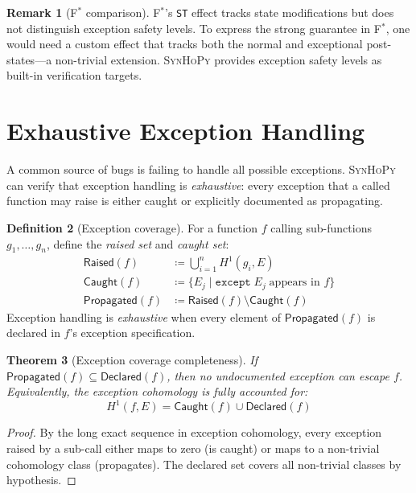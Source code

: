 \documentclass[11pt,a4paper]{report}
\theoremstyle{definition}
\newtheorem{definition}{Definition}[chapter]
\newtheorem{remark}[definition]{Remark}
\theoremstyle{plain}
\newtheorem{theorem}[definition]{Theorem}
\newcommand{\defeq}{\coloneqq}
\newcommand{\fstar}{F$^{*}$}
\newcommand{\synhopy}{\textsc{SynHoPy}}
\begin{document}
\begin{remark}[\fstar{} comparison]
\fstar{}'s \lstinline[style=fstar]|ST| effect tracks state modifications but
does not distinguish exception safety levels.  To express the strong guarantee
in \fstar{}, one would need a custom effect that tracks both the normal and
exceptional post-states---a non-trivial extension.  \synhopy{} provides
exception safety levels as built-in verification targets.
\end{remark}

\section{Exhaustive Exception Handling}

A common source of bugs is failing to handle all possible exceptions.
\synhopy{} can verify that exception handling is \emph{exhaustive}: every
exception that a called function may raise is either caught or explicitly
documented as propagating.

\begin{definition}[Exception coverage]
For a function $f$ calling sub-functions $g_1, \ldots, g_n$, define the
\emph{raised set} and \emph{caught set}:
\begin{align}
  \mathsf{Raised}(f) &\defeq \bigcup_{i=1}^{n} H^1(g_i, E) \\
  \mathsf{Caught}(f) &\defeq \{ E_j \mid \texttt{except}\;E_j\;\text{appears in } f \} \\
  \mathsf{Propagated}(f) &\defeq \mathsf{Raised}(f) \setminus \mathsf{Caught}(f)
\end{align}
Exception handling is \emph{exhaustive} when every element of
$\mathsf{Propagated}(f)$ is declared in $f$'s exception specification.
\end{definition}

\begin{theorem}[Exception coverage completeness]
If $\mathsf{Propagated}(f) \subseteq \mathsf{Declared}(f)$, then no
undocumented exception can escape $f$.  Equivalently, the exception
cohomology is fully accounted for:
\[
  H^1(f, E) = \mathsf{Caught}(f) \cup \mathsf{Declared}(f)
\]
\end{theorem}
\begin{proof}
By the long exact sequence in exception cohomology, every exception
raised by a sub-call either maps to zero (is caught) or maps to a
non-trivial cohomology class (propagates).  The declared set covers
all non-trivial classes by hypothesis.
\end{proof}
\end{document}
